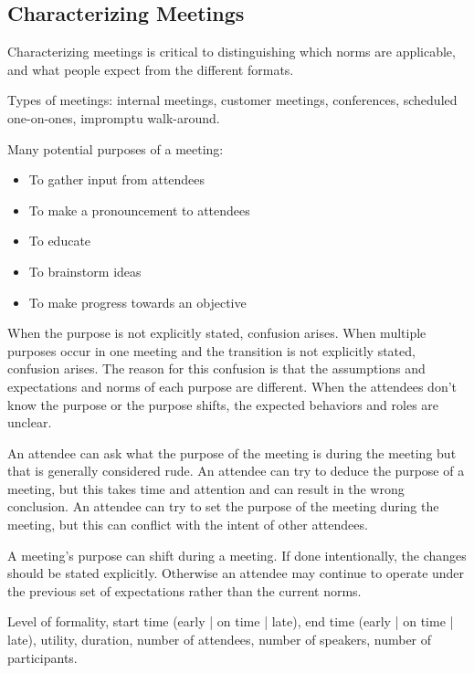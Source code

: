 \subsection{Characterizing Meetings}
Characterizing meetings is critical to distinguishing which norms are applicable, and what people expect from the different formats. 


Types of meetings: internal meetings, customer meetings, conferences, scheduled one-on-ones, impromptu walk-around.   

Many potential purposes of a meeting:
\begin{itemize}
    \item To gather input from attendees
    \item To make a pronouncement to attendees
    \item To educate
    \item To brainstorm ideas
    \item To make progress towards an objective
\end{itemize}
When the purpose is not explicitly stated, confusion arises. 
When multiple purposes occur in one meeting and the transition is not explicitly stated, confusion arises.
The reason for this confusion is that the assumptions and expectations and norms of each purpose are different. When the attendees don't know the purpose or the purpose shifts, the expected behaviors and roles are unclear. 

An attendee can ask what the purpose of the meeting is during the meeting but that is generally considered rude. An attendee can try to deduce the purpose of a meeting, but this takes time and attention and can result in the wrong conclusion. An attendee can try to set the purpose of the meeting during the meeting, but this can conflict with the intent of other attendees. 

A meeting's purpose can shift during a meeting. If done intentionally, the changes should be stated explicitly. Otherwise an attendee may continue to operate under the previous set of expectations rather than the current norms. 



Level of formality, start time (early | on time | late), 
end time (early | on time | late), utility, 
duration, number of attendees, number of speakers, number of participants.


